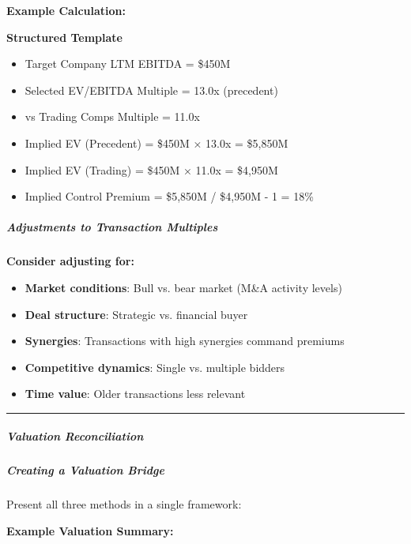 \documentclass[11pt]{article}
\begin{document}
\textbf{Example Calculation:}

\textbf{Structured Template}
\begin{itemize}[leftmargin=*,itemsep=2pt,topsep=2pt]
\item {} Target Company LTM EBITDA = \$450M
\item {} Selected EV/EBITDA Multiple = 13.0x (precedent)
\item {} vs Trading Comps Multiple = 11.0x
\item {} Implied EV (Precedent) = \$450M × 13.0x = \$5,850M
\item {} Implied EV (Trading) = \$450M × 11.0x = \$4,950M
\item {} Implied Control Premium = \$5,850M / \$4,950M - 1 = 18\%
\end{itemize}

\subparagraph{Adjustments to Transaction Multiples}\mbox{}\par

\textbf{Consider adjusting for:}

\begin{itemize}[leftmargin=*,itemsep=2pt,topsep=2pt]
\item {} \textbf{Market conditions}: Bull vs. bear market (M\&A activity levels)
\item {} \textbf{Deal structure}: Strategic vs. financial buyer
\item {} \textbf{Synergies}: Transactions with high synergies command premiums
\item {} \textbf{Competitive dynamics}: Single vs. multiple bidders
\item {} \textbf{Time value}: Older transactions less relevant
\end{itemize}

\vspace{0.5em}\hrule\vspace{0.5em}

\subparagraph{Valuation Reconciliation}\mbox{}\par

\subparagraph{Creating a Valuation Bridge}\mbox{}\par

Present all three methods in a single framework:


\textbf{Example Valuation Summary:}
\end{document}
